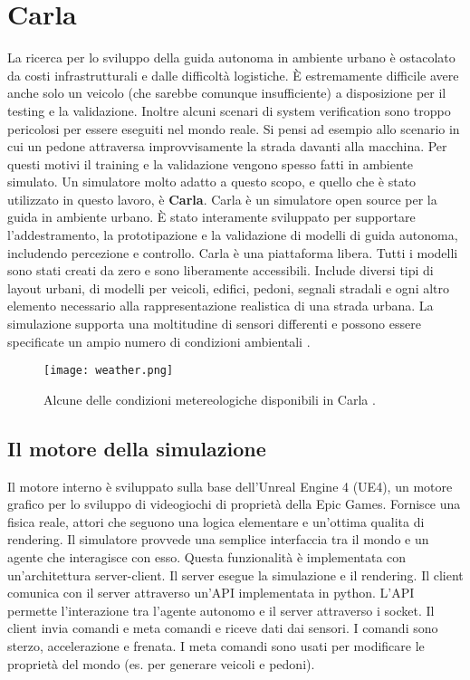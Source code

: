 \section{Carla}
La ricerca per lo sviluppo della guida autonoma in ambiente urbano è  ostacolato da costi infrastrutturali e dalle difficoltà logistiche. È
estremamente difficile avere anche solo un veicolo (che sarebbe comunque insufficiente) a disposizione per il testing e la validazione. Inoltre
alcuni scenari di system verification sono troppo pericolosi per essere eseguiti nel mondo reale. Si pensi ad esempio allo scenario in cui
un pedone attraversa improvvisamente la strada davanti alla macchina. Per questi motivi il training e la validazione vengono spesso fatti in ambiente simulato.  Un simulatore molto adatto a questo scopo, e quello che è stato utilizzato in questo lavoro,
è \textbf{Carla}. Carla è un simulatore open source per la guida in ambiente urbano. È stato interamente sviluppato per supportare l'addestramento, la prototipazione
e la validazione di modelli di guida autonoma, includendo percezione e controllo. Carla è una piattaforma libera. Tutti i modelli sono stati creati da zero
e sono liberamente accessibili. Include diversi tipi di layout urbani, di modelli per veicoli, edifici, pedoni, segnali stradali e ogni altro elemento necessario
alla rappresentazione realistica di una strada urbana.
La simulazione supporta una moltitudine di sensori differenti e possono essere specificate un ampio numero di condizioni ambientali \cite{carla}.
\begin{figure}[h]
    \texttt{[image: weather.png]}
    \caption{Alcune delle condizioni metereologiche disponibili in Carla \cite{carla}.}
    \label{fig:weath}
\end{figure}

\subsection{Il motore della simulazione}
Il motore interno è sviluppato sulla base dell'Unreal Engine 4 (UE4), un motore grafico per lo sviluppo di videogiochi di proprietà della Epic Games. Fornisce una fisica reale, attori che seguono una logica elementare e un'ottima qualita di rendering.
Il simulatore provvede una semplice interfaccia tra il mondo e un agente che interagisce con esso. Questa funzionalità è implementata con un'architettura server-client.
Il server esegue la simulazione e il rendering. Il client comunica con il server attraverso un'API implementata in python. L'API permette l'interazione tra l'agente autonomo e il server
attraverso i socket. Il client invia comandi e meta comandi e riceve dati dai sensori. I comandi sono sterzo, accelerazione e frenata. I meta comandi sono usati per modificare le proprietà
del mondo (es. per generare veicoli e pedoni).
